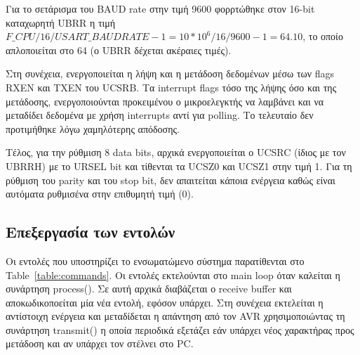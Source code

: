 \documentclass[a4paper,12pt]{article}
\begin{document}
Για το σετάρισμα του BAUD rate στην τιμή 9600 φορρτώθηκε στον 16-bit καταχωρητή UBRR η τιμή $F\_CPU/16/USART\_BAUDRATE - 1  = 10 * 10^6 / 16 / 9600 - 1 = 64.10$, το οποίο απλοποιείται στο 64 (ο UBRR δέχεται ακέραιες τιμές).

Στη συνέχεια, ενεργοποιείται η λήψη και η μετάδοση δεδομένων μέσω των flags RXEN και TXEN του UCSRB. Τα interrupt flags τόσο της λήψης όσο και της μετάδοσης, ενεργοποιούνται προκειμένου ο μικροελεγκτής να λαμβάνει και να μεταδίδει δεδομένα με χρήση interrupts αντί για polling. Το τελευταίο δεν προτιμήθηκε λόγω χαμηλότερης απόδοσης.

Τέλος, για την ρύθμιση 8 data bits, αρχικά ενεργοποιείται ο UCSRC (ίδιος με τον UBRRH) με το URSEL bit και τίθενται τα UCSZ0 και UCSZ1 στην τιμή 1. Για τη ρύθμιση του parity και του stop bit, δεν απαιτείται κάποια ενέργεια καθώς είναι αυτόματα ρυθμισένα στην επιθυμητή τιμή (0).




\subsection{Επεξεργασία των εντολών}
Οι εντολές που υποστηρίζει το ενσωματώμενο σύστημα παρατίθενται στο Table~\ref{table:commands}. Οι εντολές εκτελούνται στο main loop όταν καλείται η συνάρτηση process(). Σε αυτή αρχικά διαβάζεται ο receive buffer και αποκωδικοποείται μία νέα εντολή, εφόσον υπάρχει. Στη συνέχεια εκτελείται η αντίστοιχη ενέργεια και μεταδίδεται η απάντηση από τον AVR χρησιμοποιώντας τη συνάρτηση transmit() η οποία περιοδικά εξετάζει εάν υπάρχει νέος χαρακτήρας προς μετάδοση και αν υπάρχει τον στέλνει στο PC.
\end{document}
